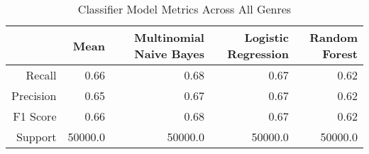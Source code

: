 \begin{table}[h]
    \centering
    \begin{tabular}{r|r|r|r|r}
         & Mean & Multinomial Naive Bayes & Logistic Regression & Random Forest \\\hline
        Recall     & 0.66 & 0.68 & 0.67 & 0.62 \\
        Precision  & 0.65 & 0.67 & 0.67 & 0.62 \\
        F1 Score   & 0.66 & 0.68 & 0.67 & 0.62 \\
        Support    & 50000.0 & 50000.0 & 50000.0 & 50000.0
\end{tabular}
    \caption{Classifier Model Metrics Across All Genres}
    \label{tab:mode_aggregation_metrics_table}
\end{table}